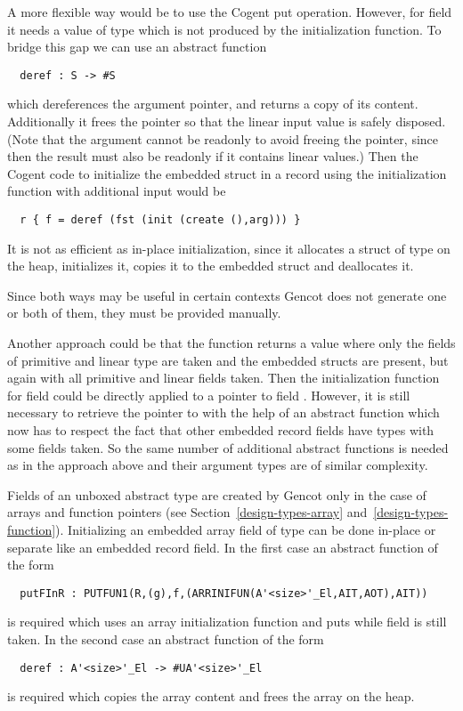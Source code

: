 A more flexible way would be to use the Cogent put operation. However, for field  it needs a value of type 
 which is not produced by the initialization function. To bridge this gap we can use an abstract function
\begin{verbatim}
  deref : S -> #S
\end{verbatim}
which dereferences the argument pointer, and returns a copy of its content. Additionally it frees the pointer so that the
linear input value is safely disposed. (Note that the argument cannot be readonly to avoid freeing the pointer, since then
the result must also be readonly if it contains linear values.) Then the Cogent code to initialize the embedded struct 
 in a record  using the initialization function  with additional input  would be
\begin{verbatim}
  r { f = deref (fst (init (create (),arg))) }
\end{verbatim}
It is not as efficient as in-place initialization, since it allocates a struct of type  on the heap, initializes it,
copies it to the embedded struct  and deallocates it.

Since both ways may be useful in certain contexts Gencot does not generate one or both of them, they must be provided manually.

Another approach could be that the function  returns a value where only the fields of primitive and linear type
are taken and the embedded structs are present, but again with all primitive and linear fields taken. Then the initialization function for
field  could be directly applied to a pointer to field . However, it is still necessary to retrieve the pointer to 
with the help of an abstract function which now has to respect the fact that other embedded record fields have types with
some fields taken. So the same number of additional abstract functions is needed as in the approach above and their argument
types are of similar complexity.

Fields of an unboxed abstract type are created by Gencot only in the case of arrays and function pointers (see 
Section~\ref{design-types-array} and~\ref{design-types-function}). Initializing an embedded array field  of type 
 can be done in-place or separate like an embedded record field. In the first case an abstract
function of the form 
\begin{verbatim}
  putFInR : PUTFUN1(R,(g),f,(ARRINIFUN(A'<size>'_El,AIT,AOT),AIT))
\end{verbatim}
is required which uses an array initialization function and puts  while field  is still taken. 
In the second case an abstract function of the form
\begin{verbatim}
  deref : A'<size>'_El -> #UA'<size>'_El
\end{verbatim}
is required which copies the array content and frees the array on the heap.


